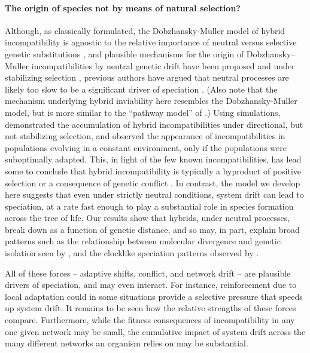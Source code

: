 \documentclass{article}
\newcommand{\1}{\mathbbm{1}}
\begin{document}
\paragraph{The origin of species not by means of natural selection?}
Although, as classically formulated, 
the Dobzhansky-Muller model of hybrid incompatibility is agnostic to the relative importance of neutral versus selective genetic substitutions \citep{coyne1998evolutionary},
and plausible mechanisms for the origin of Dobzhansky--Muller incompatibilities by neutral genetic drift have been proposed \citep{lynch2000origin} 
and under stabilizing selection \citep{fierst},
previous authors have argued that neutral processes are likely too slow to be a significant driver of speciation \citep{nei1983models,seehausen2014genomics}.
(Also note that the mechanism underlying hybrid inviability here 
resembles the Dobzhansky-Muller model,
but is more similar to the ``pathway model'' of \citet{lindtke2015genetic}.)
Using simulations, \citet{porter2002speciation} demonstrated the accumulation of hybrid incompatibilities under directional, but not stabilizing selection, and \citet{palmer2009dynamics} observed the appearance of incompatibilities in populations evolving in a constant environment, only if the populations were suboptimally adapted.
This, in light of the few known incompatibilities, has lead some to conclude that hybrid incompatibility is typically a byproduct of positive selection \citep{orr2004speciation, schluter2009evidence} 
or a consequence of genetic conflict \citep{presgraves2010molecular, crespi2013conflictual}.
In contrast, the model we develop here suggests that even under strictly neutral conditions, 
system drift can lead to speciation, at a rate fast enough 
to play a substantial role in species formation across the tree of life. 
Our results show that hybrids, under neutral processes, break down as a function of genetic distance,
and so may, in part, explain broad patterns
such as the relationship between molecular divergence and genetic isolation 
seen by \citet{roux2016shedding}, 
and the clocklike speciation patterns observed by \citet{hedges2015tree}.

All of these forces -- adaptive shifts, conflict, and network drift --
are plausible drivers of speciation, and may even interact.
For instance, reinforcement due to local adaptation could in some situations provide a selective pressure
that speeds up system drift.
It remains to be seen how the relative strengths of these forces compare.
Furthermore,
while the fitness consequences of incompatibility in any one given network may be small, 
the cumulative impact of system drift across the many different networks an organism relies on may be substantial. 
\end{document}
